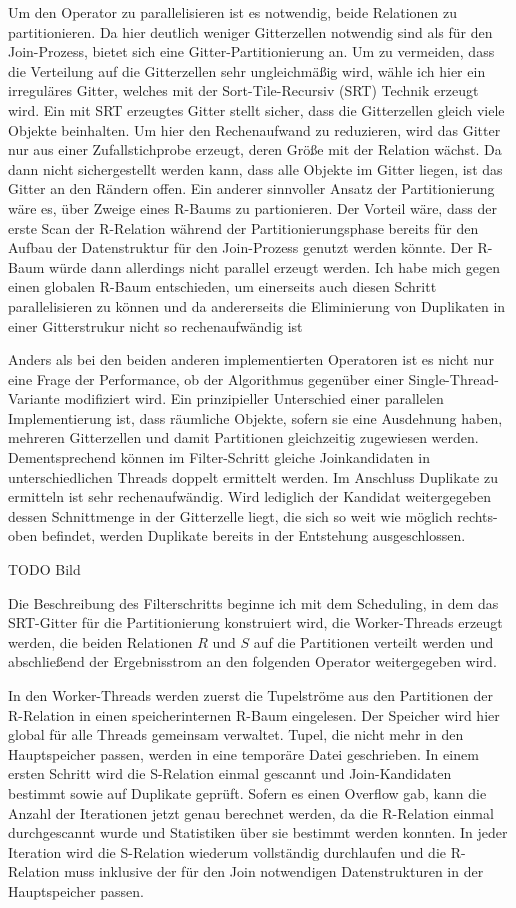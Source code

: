 \documentclass[a4paper,12pt,twoside]{article}
\begin{document}
Um den Operator zu parallelisieren ist es notwendig, beide Relationen zu partitionieren. Da hier deutlich weniger Gitterzellen notwendig sind als für den Join-Prozess, bietet sich eine Gitter-Partitionierung an. Um zu vermeiden, dass die Verteilung auf die Gitterzellen sehr ungleichmäßig wird, wähle ich hier ein irreguläres Gitter, welches mit der Sort-Tile-Recursiv (SRT) Technik erzeugt wird. Ein mit SRT erzeugtes Gitter stellt sicher, dass die Gitterzellen gleich viele Objekte beinhalten. Um hier den Rechenaufwand zu reduzieren, wird das Gitter nur aus einer Zufallstichprobe erzeugt, deren Größe mit der Relation wächst. Da dann nicht sichergestellt werden kann, dass alle Objekte im Gitter liegen, ist das Gitter an den Rändern offen. Ein anderer sinnvoller Ansatz der Partitionierung wäre es, über Zweige eines R-Baums zu partionieren. Der Vorteil wäre, dass der erste Scan der R-Relation während der Partitionierungsphase bereits für den Aufbau der Datenstruktur für den Join-Prozess genutzt werden könnte. Der R-Baum würde dann allerdings nicht parallel erzeugt werden. Ich habe mich gegen einen globalen R-Baum entschieden, um einerseits auch diesen Schritt parallelisieren zu können und da andererseits die Eliminierung von Duplikaten in einer Gitterstrukur nicht so rechenaufwändig ist

Anders als bei den beiden anderen implementierten Operatoren ist es nicht nur eine Frage der Performance, ob der Algorithmus gegenüber einer Single-Thread-Variante modifiziert wird. Ein prinzipieller Unterschied einer parallelen Implementierung ist, dass räumliche Objekte, sofern sie eine Ausdehnung haben, mehreren Gitterzellen und damit Partitionen gleichzeitig zugewiesen werden. Dementsprechend können im Filter-Schritt gleiche Joinkandidaten in unterschiedlichen Threads doppelt ermittelt werden. Im Anschluss Duplikate zu ermitteln ist sehr rechenaufwändig. Wird lediglich der Kandidat weitergegeben dessen Schnittmenge in der Gitterzelle liegt, die sich so weit wie möglich rechts-oben befindet, werden Duplikate bereits in der Entstehung ausgeschlossen.

TODO Bild

Die Beschreibung des Filterschritts beginne ich mit dem Scheduling, in dem das SRT-Gitter für die Partitionierung konstruiert wird, die Worker-Threads erzeugt werden, die beiden Relationen $R$ und $S$ auf die Partitionen verteilt werden und abschließend der Ergebnisstrom an den folgenden Operator weitergegeben wird.

In den Worker-Threads werden zuerst die Tupelströme aus den Partitionen der R-Relation in einen speicherinternen R-Baum eingelesen. Der Speicher wird hier global für alle Threads gemeinsam verwaltet. Tupel, die nicht mehr in den Hauptspeicher passen, werden in eine temporäre Datei geschrieben. In einem ersten Schritt wird die S-Relation einmal gescannt und Join-Kandidaten bestimmt sowie auf Duplikate geprüft.  Sofern es einen Overflow gab, kann die Anzahl der Iterationen jetzt genau berechnet werden, da die R-Relation einmal durchgescannt wurde und Statistiken über sie bestimmt werden konnten. In jeder Iteration wird die S-Relation wiederum vollständig durchlaufen und die R-Relation muss inklusive der für den Join notwendigen Datenstrukturen in der Hauptspeicher passen.
\end{document}
